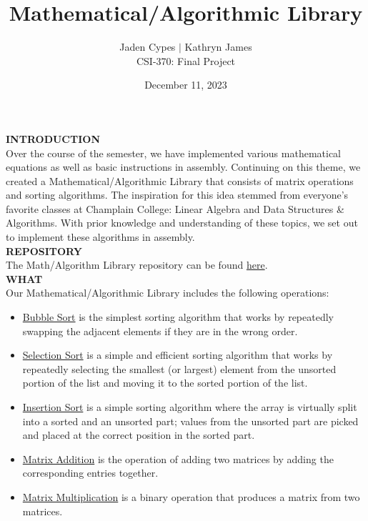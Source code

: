 \documentclass[twoside]{article}
\date{December 11, 2023}
\begin{document}
\title{Mathematical/Algorithmic Library}
\author{Jaden Cypes \(|\) Kathryn James\\CSI-370: Final Project}
\maketitle
\renewcommand{\labelitemi}{$\diamond$}


\noindent \textbf{INTRODUCTION}
\\Over the course of the semester, we have implemented various mathematical equations as well as basic instructions in assembly. Continuing on this theme, we created a Mathematical/Algorithmic Library that consists of matrix operations and sorting algorithms. The inspiration for this idea stemmed from everyone’s favorite classes at Champlain College: Linear Algebra and Data Structures \& Algorithms. With prior knowledge and understanding of these topics, we set out to implement these algorithms in assembly.\\


\noindent \textbf{REPOSITORY}
\\The Math/Algorithm Library repository can be found \href{https://github.com/katiepo456/math_algorithm_library}{here}.\\


\noindent \textbf{WHAT}
\\Our Mathematical/Algorithmic Library includes the following operations:
\begin{itemize}
\item \underline{Bubble Sort} is the simplest sorting algorithm that works by repeatedly swapping the adjacent elements if they are in the wrong order.
\item \underline{Selection Sort} is a simple and efficient sorting algorithm that works by repeatedly selecting the smallest (or largest) element from the unsorted portion of the list and moving it to the sorted portion of the list.
\item \underline{Insertion Sort} is a simple sorting algorithm where the array is virtually split into a sorted and an unsorted part; values from the unsorted part are picked and placed at the correct position in the sorted part.
\item \underline{Matrix Addition} is the operation of adding two matrices by adding the corresponding entries together.
\item \underline{Matrix Multiplication} is a binary operation that produces a matrix from two matrices.
\end{itemize}
\end{document}
